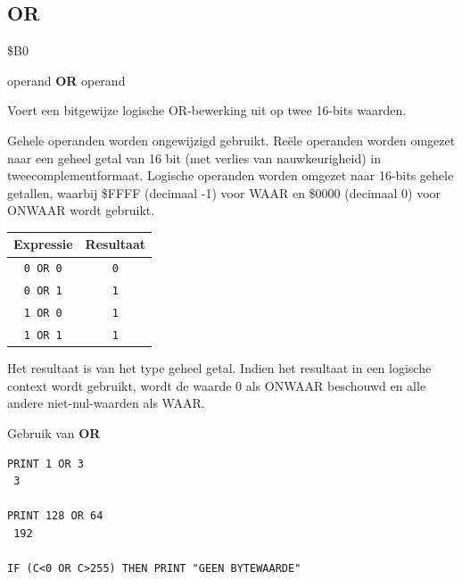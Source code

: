 \subsection{OR}
\begin{description}[leftmargin=2cm,style=nextline]
\item [Token:]    \$B0

\item [Formaat:]   operand {\bf OR} operand

\item [Gebruik:]    Voert een bitgewijze logische OR-bewerking uit op twee 16-bits waarden.

                  Gehele operanden worden ongewijzigd gebruikt. Reële operanden worden omgezet naar een geheel getal van 16 bit (met verlies van nauwkeurigheid) in tweecomplementformaat. Logische operanden worden omgezet naar 16-bits gehele getallen, waarbij \$FFFF (decimaal -1) voor WAAR en \$0000 (decimaal 0) voor ONWAAR wordt gebruikt.

                  \begin{center}
                  \setlength{\tabcolsep}{1mm}
                     \begin{tabular}{|c|c|}
                        \hline
                        {\bf Expressie} & {\bf Resultaat}  \\
                        \hline
                           \texttt{0 OR 0}  &  \texttt{0} \\                        \texttt{0 OR 1}  &  \texttt{1} \\                           \texttt{1 OR 0}  &  \texttt{1} \\                           \texttt{1 OR 1}  &  \texttt{1} \\
                        \hline
                     \end{tabular}
                  \end{center}

\item [Opmerkingen:]  Het resultaat is van het type geheel getal. Indien het resultaat in een logische context wordt gebruikt, wordt de waarde 0 als ONWAAR beschouwd en alle andere niet-nul-waarden als WAAR.

\item [Voorbeelden:] Gebruik van {\bf OR}

\begin{tcolorbox}[colback=black,coltext=white]
\verbatimfont{\codefont}
\begin{verbatim}
PRINT 1 OR 3
 3

PRINT 128 OR 64
 192

IF (C<0 OR C>255) THEN PRINT "GEEN BYTEWAARDE"
\end{verbatim}
\end{tcolorbox}
\end{description}

